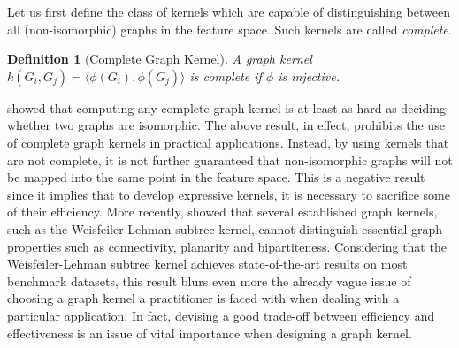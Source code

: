 \documentclass[twoside,11pt]{article}
\newtheorem{definition}{Definition}
\begin{document}
Let us first define the class of kernels which are capable of distinguishing between all (non-isomorphic) graphs in the feature space.
Such kernels are called \textit{complete}.
\begin{definition}[Complete Graph Kernel]
  A graph kernel $k(G_i,G_j) = \langle \phi(G_i), \phi(G_j) \rangle$ is complete if $\phi$ is injective.
\end{definition}
 showed that computing any complete graph kernel is at least as hard as deciding whether two graphs are isomorphic.
The above result, in effect, prohibits the use of complete graph kernels in practical applications.
Instead, by using kernels that are not complete, it is not further guaranteed that non-isomorphic graphs will not be mapped into the same point in the feature space.
This is a negative result since it implies that to develop expressive kernels, it is necessary to sacrifice some of their efficiency.
More recently,  showed that several established graph kernels, such as the Weisfeiler-Lehman subtree kernel, cannot distinguish essential graph properties such as connectivity, planarity and bipartiteness.
Considering that the Weisfeiler-Lehman subtree kernel achieves state-of-the-art results on most benchmark datasets, this result blurs even more the already vague issue of choosing a graph kernel a practitioner is faced with when dealing with a particular application.
In fact, devising a good trade-off between efficiency and effectiveness is an issue of vital importance when designing a graph kernel.
\end{document}
